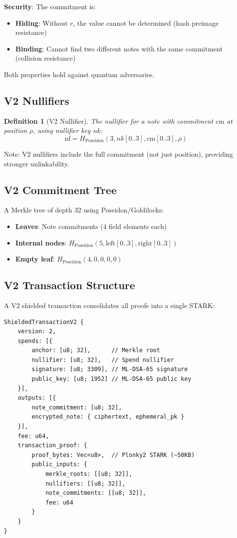 \documentclass[11pt,a4paper]{article}
\newtheorem{definition}{Definition}
\begin{document}
\textbf{Security}: The commitment is:
\begin{itemize}
    \item \textbf{Hiding}: Without $r$, the value cannot be determined (hash preimage resistance)
    \item \textbf{Binding}: Cannot find two different notes with the same commitment (collision resistance)
\end{itemize}

Both properties hold against quantum adversaries.

\subsection{V2 Nullifiers}

\begin{definition}[V2 Nullifier]
The nullifier for a note with commitment $\text{cm}$ at position $\rho$, using nullifier key $nk$:
\begin{equation}
\text{nf} = H_{\text{Poseidon}}(3, nk[0..3], \text{cm}[0..3], \rho)
\end{equation}
\end{definition}

Note: V2 nullifiers include the full commitment (not just position), providing stronger unlinkability.

\subsection{V2 Commitment Tree}

A Merkle tree of depth 32 using Poseidon/Goldilocks:

\begin{itemize}
    \item \textbf{Leaves}: Note commitments (4 field elements each)
    \item \textbf{Internal nodes}: $H_{\text{Poseidon}}(5, \text{left}[0..3], \text{right}[0..3])$
    \item \textbf{Empty leaf}: $H_{\text{Poseidon}}(4, 0, 0, 0, 0)$
\end{itemize}

\subsection{V2 Transaction Structure}

A V2 shielded transaction consolidates all proofs into a single STARK:

\begin{lstlisting}
ShieldedTransactionV2 {
    version: 2,
    spends: [{
        anchor: [u8; 32],      // Merkle root
        nullifier: [u8; 32],   // Spend nullifier
        signature: [u8; 3309], // ML-DSA-65 signature
        public_key: [u8; 1952] // ML-DSA-65 public key
    }],
    outputs: [{
        note_commitment: [u8; 32],
        encrypted_note: { ciphertext, ephemeral_pk }
    }],
    fee: u64,
    transaction_proof: {
        proof_bytes: Vec<u8>,  // Plonky2 STARK (~50KB)
        public_inputs: {
            merkle_roots: [[u8; 32]],
            nullifiers: [[u8; 32]],
            note_commitments: [[u8; 32]],
            fee: u64
        }
    }
}
\end{lstlisting}
\end{document}
